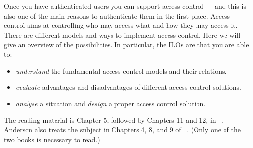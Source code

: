 Once you have authenticated users you can support access control --- and this 
is also one of the main reasons to authenticate them in the first place.
Access control aims at controlling who may access what and how they may access 
it.
There are different models and ways to implement access control.
Here we will give an overview of the possibilities.
In particular, the \acp{ILO} are that you are able to:
\begin{itemize}
  \item \emph{understand} the fundamental access control models and their 
    relations.
  \item \emph{evaluate} advantages and disadvantages of different access 
    control solutions.
  \item \emph{analyse} a situation and \emph{design} a proper access control 
    solution.
\end{itemize}

The reading material is Chapter 5, followed by Chapters 11 and 12, in 
~\cite{Gollmann2011cs}.
Anderson also treats the subject in Chapters 4, 8, and 
9 of ~\cite{Anderson2008sea}.
(Only one of the two books is necessary to read.)
